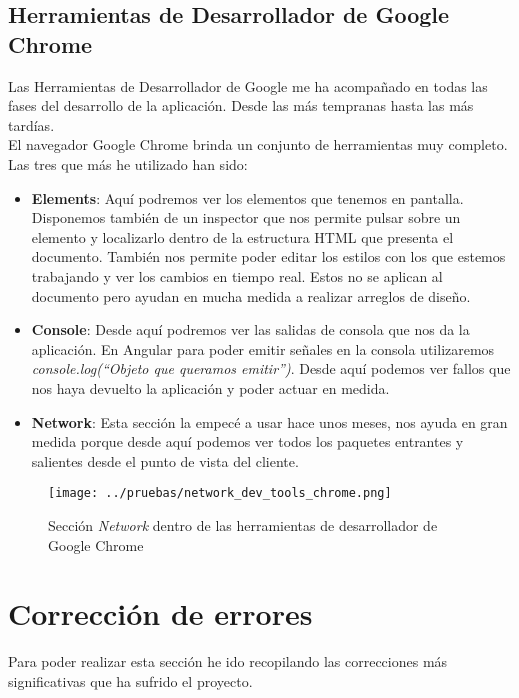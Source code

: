 \subsection{Herramientas de Desarrollador de Google Chrome}
Las Herramientas de Desarrollador de Google me ha acompañado en todas las fases del desarrollo de la aplicación. Desde las más tempranas hasta las más tardías.
\\El navegador Google Chrome brinda un conjunto de herramientas muy completo. Las tres que más he utilizado han sido:
\begin{itemize}
    \item \textbf{Elements}: Aquí podremos ver los elementos que tenemos en pantalla. Disponemos también de un inspector que nos permite pulsar sobre un elemento y localizarlo dentro de la estructura HTML que presenta el documento. También nos permite poder editar los estilos con los que estemos trabajando y ver los cambios en tiempo real. Estos no se aplican al documento pero ayudan en mucha medida a realizar arreglos de diseño.
    \item \textbf{Console}: Desde aquí podremos ver las salidas de consola que nos da la aplicación. En Angular para poder emitir señales en la consola utilizaremos \textit{console.log(``Objeto que queramos emitir'')}. Desde aquí podemos ver fallos que nos haya devuelto la aplicación y poder actuar en medida.
    \item \textbf{Network}: Esta sección la empecé a usar hace unos meses, nos ayuda en gran medida porque desde aquí podemos ver todos los paquetes entrantes y salientes desde el punto de vista del cliente.
\end{itemize}
\begin{figure}[h]
    \centering
    \texttt{[image: ../pruebas/network\_dev\_tools\_chrome.png]}
    \caption{Sección \textit{Network} dentro de las herramientas de desarrollador de Google Chrome}
\end{figure}
\section{Corrección de errores}
Para poder realizar esta sección he ido recopilando las correcciones más significativas que ha sufrido el proyecto.

